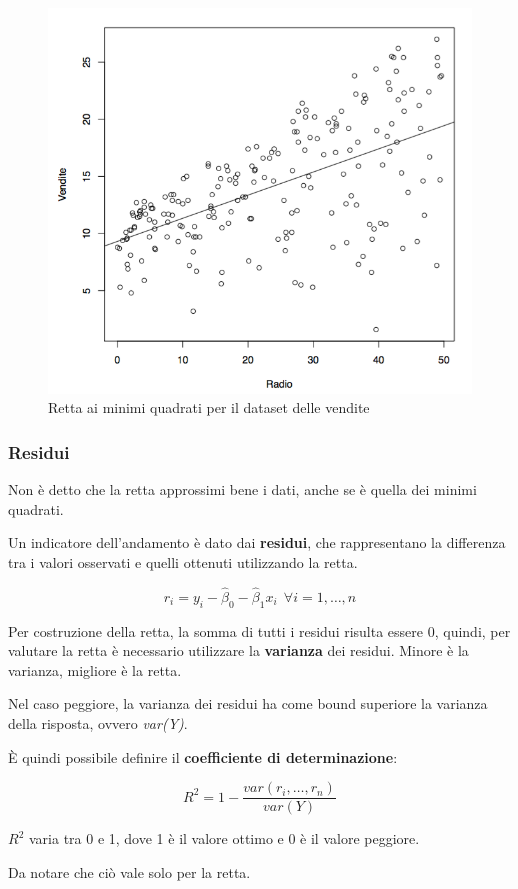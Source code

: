 \begin{figure}[htbp]
\centering
\includegraphics{./notes/immagini/l3-figura5.png}
\caption{Retta ai minimi quadrati per il dataset delle vendite}
\end{figure}

\subsubsection{Residui}\label{residui}

Non è detto che la retta approssimi bene i dati, anche se è quella dei
minimi quadrati.

Un indicatore dell'andamento è dato dai \textbf{residui}, che
rappresentano la differenza tra i valori osservati e quelli ottenuti
utilizzando la retta.

$$ r_i = y_i - \hat{\beta}_0 - \hat{\beta}_1x_i \: \: \forall i = 1, \ldots, n$$

Per costruzione della retta, la somma di tutti i residui risulta essere
0, quindi, per valutare la retta è necessario utilizzare la
\textbf{varianza} dei residui. Minore è la varianza, migliore è la
retta.

Nel caso peggiore, la varianza dei residui ha come bound superiore la
varianza della risposta, ovvero \emph{var(Y)}.

È quindi possibile definire il \textbf{coefficiente di determinazione}:

$$
R^2 = 1 - \frac{var(r_i, \ldots, r_n)}{var(Y)}
$$

$R^2$ varia tra 0 e 1, dove 1 è il valore ottimo e 0 è il valore
peggiore.

Da notare che ciò vale solo per la retta.
